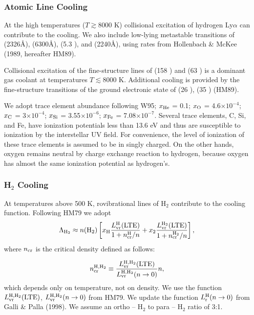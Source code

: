 \subsubsection{Atomic Line Cooling}
At the high temperatures ($T\gtrsim 8000$ K) collisional excitation 
of hydrogen Ly$\alpha$ can contribute to the cooling.
We also include low-lying metastable transitions of 
 (2326\AA),  (6300\AA),  (5.3 \micron), 
and  (2240\AA),
using rates from Hollenbach \& McKee (1989, hereafter HM89).

Collisional excitation of the fine-structure lines of
 (158 \micron) and  (63 \micron) is a dominant gas coolant 
at temperatures $T\lesssim 8000$ K.
Additional cooling is provided by the 
fine-structure transitions of the ground electronic state
of  (26 \micron),  (35 \micron) (HM89).

We adopt trace element abundance following W95; 
$x_{\rm He}$ = 0.1;
$x_{\rm O}$ = 4.6$\times 10^{-4}$; 
$x_{\rm C}$ = 3$\times 10^{-4}$; 
$x_{\rm Si}$ = 3.55$\times 10^{-6}$; 
$x_{\rm Fe}$ = 7.08$\times 10^{-7}$. 
Several trace elements, C, Si, and Fe, have ionization potentials less than 
13.6 eV and thus are susceptible to ionization by the interstellar UV field.
For convenience, the level of ionization of these trace elements is
assumed to be in singly charged.
On the other hands, 
oxygen remains neutral by charge exchange reaction to hydrogen, 
because oxygen has almost the same ionization potential as hydrogen's.  


\subsubsection{H$_2$ Cooling}
At temperatures above 500 K, rovibrational lines of H$_2$
contribute to the cooling function.
Following HM79 we adopt
\begin{equation}
\Lambda_{\rm H_2}\approx n({\rm H_2})\left[
 x_{\rm H}\frac{L_{\rm vr}^{\rm H}({\rm LTE})}{1+n^{\rm H}_{\rm cr}/n}
+x_{\rm 2}\frac{L_{\rm vr}^{\rm H_2}({\rm LTE})}{1+n^{\rm H_2}_{\rm cr}/n}
\right],
\end{equation}
where $n_{\rm cr}$ is the critical density defined as follows:

\begin{equation}
n_{\rm cr}^{\rm H,H_2}\equiv 
\frac{L_{\rm vr}^{\rm H,H_2}({\rm LTE})}{L_{\rm vr}^{\rm H,H_2}(n\to 0)}n,
\end{equation}
which depends only on temperature, not on density.
We use the function $L_{\rm vr}^{\rm H,H_2}({\rm LTE})$,
$L_{\rm vr}^{\rm H,H_2}(n \to 0)$ from HM79.
We update the function $L^{\rm H}_{\rm r}(n \to 0)$ from Galli \& Palla (1998).
We assume an ortho -- H$_2$ to para -- H$_2$ ratio of 3:1.


